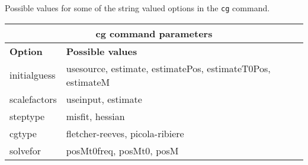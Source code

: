 \documentclass[11pt]{report}
\begin{document}
Possible values for some of the string valued options in the {\tt cg} command.
\begin{center}
\begin{tabular}{|l|p{8cm}|} \hline
\multicolumn{2}{|c|}{\bf cg command parameters }\\ \hline
\bf{Option} & \bf{Possible values}  \\ \hline \hline
initialguess & usesource, estimate, estimatePos, estimateT0Pos, estimateM \\ \hline
scalefactors & useinput, estimate  \\ \hline
steptype & misfit, hessian  \\ \hline
cgtype & fletcher-reeves, picola-ribiere \\ \hline
solvefor & posMt0freq, posMt0, posM \\ \hline
\end{tabular}
\end{center}
\end{document}
